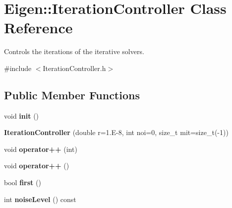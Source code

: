 \hypertarget{class_eigen_1_1_iteration_controller}{}\section{Eigen\+:\+:Iteration\+Controller Class Reference}
\label{class_eigen_1_1_iteration_controller}


Controls the iterations of the iterative solvers.  




{\ttfamily \#include $<$Iteration\+Controller.\+h$>$}

\subsection*{Public Member Functions}
\begin{DoxyCompactItemize}
\item 
\mbox{\label{class_eigen_1_1_iteration_controller_a192cc7f73d6595d169f0ba09d4296cda}} 
void {\bfseries init} ()
\item 
\mbox{\label{class_eigen_1_1_iteration_controller_a85385eecf35223c3ea985d0cea1b33ae}} 
{\bfseries Iteration\+Controller} (double r=1.\+E-\/8, int noi=0, size\+\_\+t mit=size\+\_\+t(-\/1))
\item 
\mbox{\label{class_eigen_1_1_iteration_controller_a89f3f6d2826e8e3a462a62c297c8d139}} 
void {\bfseries operator++} (int)
\item 
\mbox{\label{class_eigen_1_1_iteration_controller_a61e41184c8858f847d87a7dfb751c7f9}} 
void {\bfseries operator++} ()
\item 
\mbox{\label{class_eigen_1_1_iteration_controller_ae8d50bf180cbcf9f1201dfff5274aac5}} 
bool {\bfseries first} ()
\item 
\mbox{\label{class_eigen_1_1_iteration_controller_ab3e02d3d9f2c08ac9e41cfa93856e0ae}} 
int {\bfseries noise\+Level} () const
\item 
\mbox{\label{class_eigen_1_1_iteration_controller_a99621a09b56cf6edeb536302bddf6417}} 

\end{DoxyCompactItemize}

